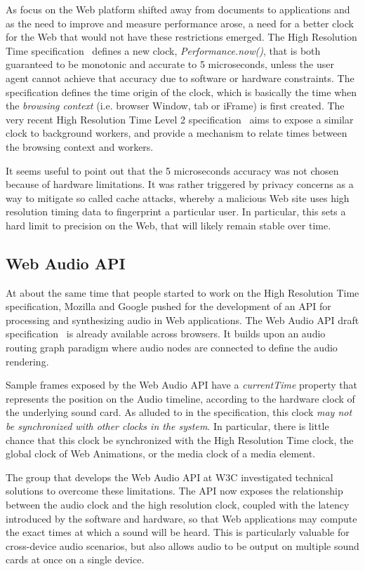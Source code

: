 \documentclass[graybox]{svmult}
\begin{document}
As focus on the Web platform shifted away from documents to applications and
as the need to improve and measure performance arose, a need for a better
clock for the Web that would not have these restrictions emerged. The High
Resolution Time specification~\cite{hrt1} defines a new clock,
\emph{Performance.now()}, that is both guaranteed to be monotonic and accurate
to 5 microseconds, unless the user agent cannot achieve that accuracy due to
software or hardware constraints. The specification defines the time origin of
the clock, which is basically the time when the \emph{browsing context} (i.e.
browser Window, tab or iFrame) is first created. The very recent High
Resolution Time Level 2 specification~\cite{hrt2} aims to expose a similar
clock to background workers, and provide a mechanism to relate times between
the browsing context and workers.

It seems useful to point out that the 5 microseconds accuracy was not chosen
because of hardware limitations. It was rather triggered by privacy concerns
as a way to mitigate so called cache attacks, whereby a malicious Web site
uses high resolution timing data to fingerprint a particular user. In
particular, this sets a hard limit to precision on the Web, that will likely
remain stable over time.


\subsection{Web Audio API}
\label{sec:webaudio}

At about the same time that people started to work on the High Resolution Time
specification, Mozilla and Google pushed for the development of an API for
processing and synthesizing audio in Web applications. The Web Audio API draft
specification~\cite{webaudio} is already available across browsers. It builds upon an
audio routing graph paradigm where audio nodes are connected to define the
audio rendering.

Sample frames exposed by the Web Audio API have a \emph{currentTime} property that
represents the position on the Audio timeline, according to the hardware clock of the underlying
sound card. As alluded to in the specification, this clock \emph{may not be
synchronized with other clocks in the system}. In particular, there is little
chance that this clock be synchronized with the High Resolution Time clock,
the global clock of Web Animations, or the media clock of a media element.

The group that develops the Web Audio API at W3C investigated technical
solutions to overcome these limitations. The API now exposes the relationship
between the audio clock and the high resolution clock, coupled with the
latency introduced by the software and hardware, so that Web applications may
compute the exact times at which a sound will be heard. This is particularly
valuable for cross-device audio scenarios, but also allows audio to
be output on multiple sound cards at once on a single device.
\end{document}
